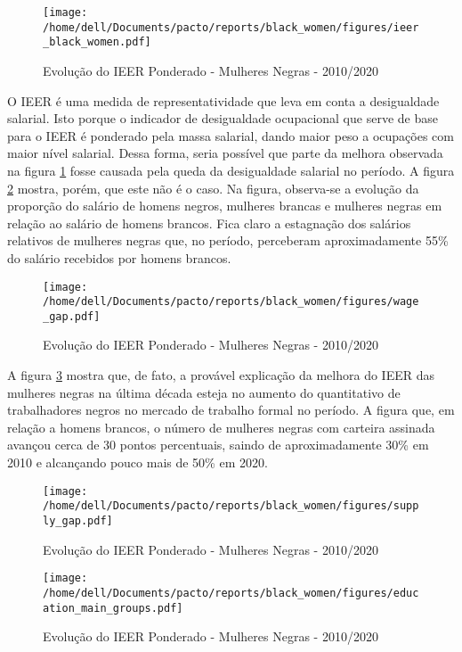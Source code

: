 \documentclass[12pt]{article}
\begin{document}
\begin{figure}[H]
    \centering
    \caption{Evolução do IEER Ponderado - Mulheres Negras - 2010/2020}
        \texttt{[image: /home/dell/Documents/pacto/reports/black\_women/figures/ieer\_black\_women.pdf]}
    \label{fig:ieer_evolution}
\end{figure}

\par O IEER é uma medida de representatividade que leva em conta a desigualdade salarial. Isto porque o indicador de desigualdade ocupacional que serve de base para o IEER é ponderado pela massa salarial, dando maior peso a ocupações com maior nível salarial. Dessa forma, seria possível que parte da melhora observada na figura \ref{fig:ieer_evolution} fosse causada pela queda da desigualdade salarial no período. A figura \ref{fig:wage_gap} mostra, porém, que este não é o caso. Na figura, observa-se a evolução da proporção do salário de homens negros, mulheres brancas e mulheres negras em relação ao salário de homens brancos. Fica claro a estagnação dos salários relativos de mulheres negras que, no período, perceberam aproximadamente 55\% do salário recebidos por homens brancos.

\begin{figure}[H]
    \centering
    \caption{Evolução do IEER Ponderado - Mulheres Negras - 2010/2020}
        \texttt{[image: /home/dell/Documents/pacto/reports/black\_women/figures/wage\_gap.pdf]}
    \label{fig:wage_gap}
\end{figure}

\par A figura \ref{fig:supply_gap} mostra que, de fato, a provável explicação da melhora do IEER das mulheres negras na última década esteja no aumento do quantitativo de trabalhadores negros no mercado de trabalho formal no período. A figura que, em relação a homens brancos, o número de mulheres negras com carteira assinada avançou cerca de 30 pontos percentuais, saindo de aproximadamente 30\% em 2010 e alcançando pouco mais de 50\% em 2020.


\begin{figure}[H]
    \centering
    \caption{Evolução do IEER Ponderado - Mulheres Negras - 2010/2020}
        \texttt{[image: /home/dell/Documents/pacto/reports/black\_women/figures/supply\_gap.pdf]}
    \label{fig:supply_gap}
\end{figure}



\begin{figure}[H]
    \centering
    \caption{Evolução do IEER Ponderado - Mulheres Negras - 2010/2020}
        \texttt{[image: /home/dell/Documents/pacto/reports/black\_women/figures/education\_main\_groups.pdf]}
\end{figure}
\end{document}
